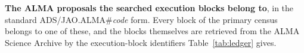 \begin{table}
\centering
\scriptsize
\caption{\textbf{The \NProjCodes{} ALMA proposals the searched execution
blocks belong to}, in the standard
\mbox{ADS/JAO.ALMA\#\textit{code}} form. Every block of the primary census
belongs to one of these, and the blocks themselves are retrieved from the
ALMA Science Archive by the execution-block identifiers
Table~\ref{tab:ledger} gives.\ProjCodeUnresClause}
\label{tab:projcodes}

\end{table}

